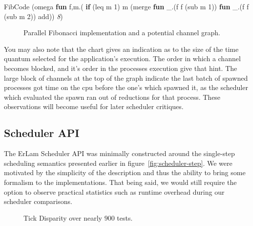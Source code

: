 \begin{SaveVerbatim}[commandchars=\\\{\}]{FibCode}
(omega \textbf{fun} f,m.(
    \textbf{if} (leq m 1) 
       m
       (merge \textbf{fun} _.(f f (sub m 1))
              \textbf{fun} _.(f f (sub m 2))
              add)) \textit{8})
\end{SaveVerbatim}
\begin{figure}[h!]

%
    \caption{Parallel Fibonacci implementation and a potential channel graph.}
    \label{fig:fibonacci-channel-demo}
\end{figure}

You may also note that the chart gives an indication as to the size of the time
quantum selected for the application's execution. The order in which a channel
becomes blocked, and it's order in the processes execution give that hint. The
large block of channels at the top of the graph indicate the last batch of 
spawned processes got time on the cpu before the one's which spawned it, as the
scheduler which evaluated the spawn ran out of reductions for that process. 
These observations will become useful for later scheduler critiques.

\subsection{Scheduler API}\label{sec:results-evaluation-classical}

The ErLam Scheduler API was minimally constructed around the single-step 
scheduling semantics presented earlier in figure~\ref{fig:scheduler-step}.
We were motivated by the simplicity of the description and thus the ability
to bring some formalism to the implementations. That being said, we would still
require the option to observe practical statistics such as runtime overhead 
during our scheduler comparisons. 

\begin{figure}[h!]
    \caption{Tick Disparity over nearly $900$ tests.}
\end{figure}

